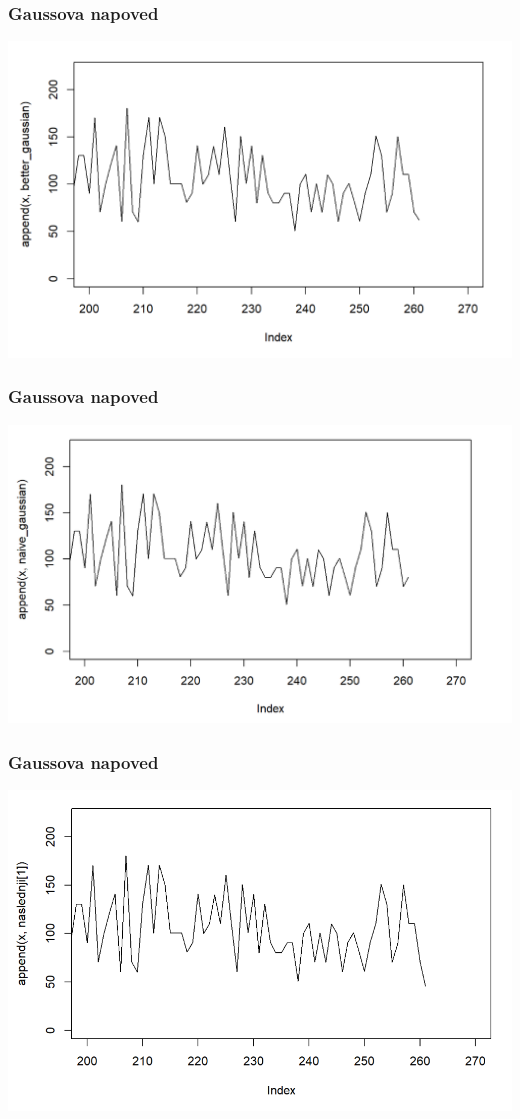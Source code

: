 \documentclass[10pt]{beamer}
\begin{document}
\begin{frame}
\frametitle{Gaussova napoved}
\includegraphics[width=1\textwidth]{betterB.png}
\end{frame}
\begin{frame}
\frametitle{Gaussova napoved}
\includegraphics[width=1\textwidth]{naiveB.png}
\end{frame}
\begin{frame}
\frametitle{Gaussova napoved}
\includegraphics[width=1\textwidth]{naslednjiB.png}
\end{frame}
\end{document}
